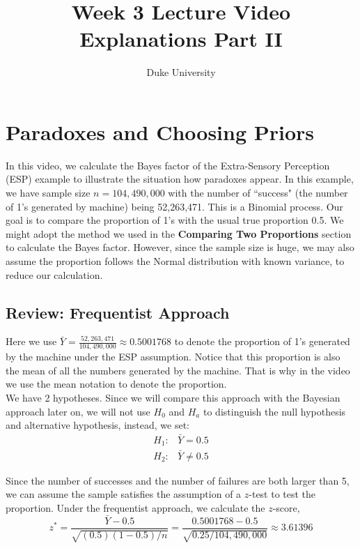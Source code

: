 \documentclass{article}
\def\dsst{\displaystyle}
\begin{document}
\title{Week 3 Lecture Video Explanations Part II}
\author{Duke University}
\date{}
\maketitle 

\section{Paradoxes and Choosing Priors}

In this video, we calculate the Bayes factor of the Extra-Sensory Perception (ESP) example to illustrate the situation how paradoxes appear. In this example, we have sample size $n = 104,490,000$ with the number of ``success" (the number of 1's generated by machine) being 52,263,471. This is a Binomial process. Our goal is to compare the proportion of 1's with the usual true proportion 0.5. We might adopt the method we used in the \textbf{Comparing Two Proportions} section to calculate the Bayes factor. However, since the sample size is huge, we may also assume the proportion follows the Normal distribution with known variance, to reduce our calculation. 

\subsection{Review: Frequentist Approach}

Here we use $\bar{Y} = \dsst \frac{52,263,471}{104,490,000} \approx 0.5001768$ to denote the proportion of 1's generated by the machine under the ESP assumption. Notice that this proportion is also the mean of all the numbers generated by the machine. That is why in the video we use the mean notation to denote the proportion. \\

We have 2 hypotheses. Since we will compare this approach with the Bayesian approach later on, we will not use $H_0$ and $H_a$ to distinguish the null hypothesis and alternative hypothesis, instead, we set:
\begin{align*}
H_1: & \bar{Y} = 0.5\\
H_2: & \bar{Y} \neq 0.5
\end{align*}

Since the number of successes and the number of failures are both larger than 5, we can assume the sample satisfies the assumption of a $z$-test to test the proportion. Under the frequentist approach, we calculate the $z$-score, 
$$ z^* = \frac{\bar{Y} - 0.5}{\sqrt{(0.5)(1 - 0.5) / n}} = \frac{0.5001768 - 0.5}{\sqrt{0.25 / 104,490,000}} \approx 3.61396 $$
\end{document}
